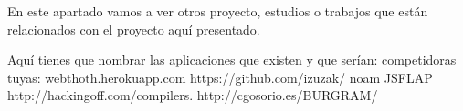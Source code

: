
En este apartado vamos a ver otros proyecto, estudios o trabajos que están relacionados con el proyecto aquí presentado.


Aquí tienes que nombrar las aplicaciones que existen y que serían: competidoras tuyas:
webthoth.herokuapp.com
https://github.com/izuzak/
noam
JSFLAP
http://hackingoff.com/compilers.
http://cgosorio.es/BURGRAM/